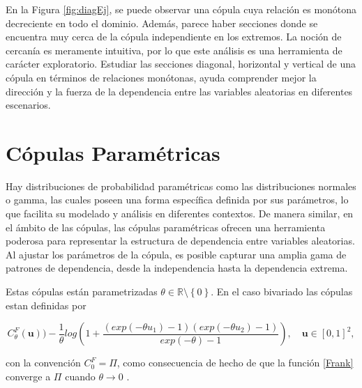 En la Figura \ref{fig:diagEj}, se puede observar una cópula cuya relación es monótona decreciente en todo el dominio. Además, parece haber secciones donde se encuentra muy cerca de la cópula independiente en los extremos. La noción de cercanía es meramente intuitiva, por lo que este análisis es una herramienta de carácter exploratorio. Estudiar las secciones diagonal, horizontal y vertical de una cópula en términos de relaciones monótonas, ayuda comprender mejor la dirección y la fuerza de la dependencia entre las variables aleatorias en diferentes escenarios. 




\section{Cópulas Paramétricas}

Hay distribuciones de probabilidad paramétricas como las distribuciones normales o gamma, las cuales poseen una forma específica definida por sus parámetros, lo que facilita su modelado y análisis en diferentes contextos. De manera similar, en el ámbito de las cópulas, las cópulas paramétricas ofrecen una herramienta poderosa para  representar la estructura de dependencia entre variables aleatorias. Al ajustar los parámetros de la cópula, es posible capturar una amplia gama de patrones de dependencia, desde la independencia hasta la dependencia extrema. 

\begin{ejemplo}
    Estas cópulas están parametrizadas $\theta \in \mathbb{R} \setminus \left\{ 0 \right\}$. En el caso bivariado las cópulas estan definidas por

    \begin{equation}\label{Frank}
    C_{\theta}^{F}(\boldsymbol{u}) ) -\frac{1}{\theta} log\left ( 1 + \frac{(exp(-\theta u_1)-1)(exp(-\theta u_2)-1)}{exp(-\theta)-1} \right ), \quad \boldsymbol{u} \in [0, 1]^2,    
    \end{equation}
    
con la convención $C_{0}^{F} = \Pi$, como consecuencia de hecho de que la función \eqref{Frank} converge a $\Pi$ cuando $\theta \to 0$ \cite{CopulasR}.
\end{ejemplo}


